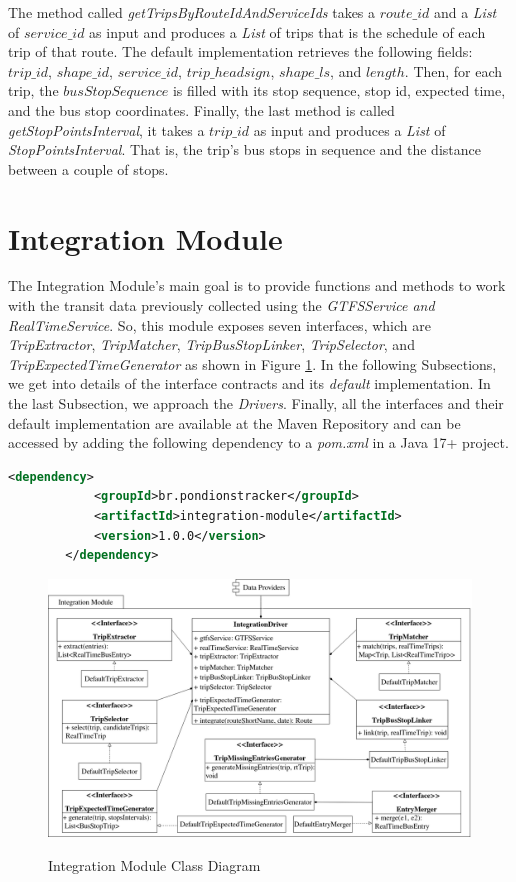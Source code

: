 The method called \textit{getTripsByRouteIdAndServiceIds} takes a $route\_id$ and a \textit{List} of 
$service\_id$ as input and produces a \textit{List} of trips that is the schedule of each trip of that route. 
The default implementation retrieves the following fields: $trip\_id$, $shape\_id$, $service\_id$, 
$trip\_headsign$, $shape\_ls$, and $length$. Then, for each trip, the $busStopSequence$ is filled with
its stop sequence, stop id, expected time, and the bus stop coordinates. 
Finally, the last method is called \textit{getStopPointsInterval}, it takes a $trip\_id$ as input and 
produces a \textit{List} of \textit{StopPointsInterval}. That is, the trip's bus stops in sequence and
the distance between a couple of stops.



\section{Integration Module}
\label{sub:integration}
The Integration Module's main goal is to provide functions and methods to 
work with the transit data previously collected using the {\em GTFSService and RealTimeService}.
So, this module exposes seven interfaces, which are \textit{TripExtractor}, 
\textit{TripMatcher},
\textit{TripBusStopLinker},
\textit{TripSelector},
and \textit{TripExpectedTimeGenerator} as shown in Figure \ref{cdIntegration}. 
In the following Subsections, we get into details of the interface contracts
and its{ \em default} implementation. In the last Subsection, we approach the 
\textit{Drivers}. Finally, all the interfaces and their default implementation are  
available at the Maven Repository and can be accessed by adding the 
following dependency to a \textit{pom.xml} in a Java 17+ project.
\begin{lstlisting}[language=XML]
		<dependency>
			<groupId>br.pondionstracker</groupId>
			<artifactId>integration-module</artifactId>
			<version>1.0.0</version>
		</dependency>
\end{lstlisting}


\begin{figure}[t]
     \centering
        \caption{Integration Module Class Diagram}
        \includegraphics[width=\textwidth]{imagem/cap4/integrationModuleCD.png}
        \label{cdIntegration}
\end{figure}


